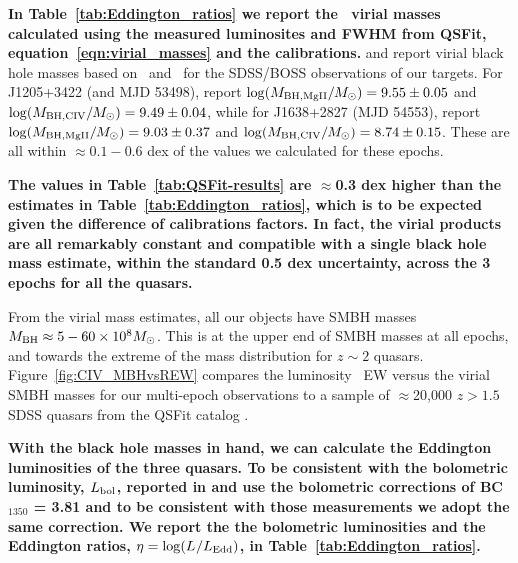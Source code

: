 \documentclass[fleqn,usenatbib]{mnras}
\begin{document}
{\bf In Table~\ref{tab:Eddington_ratios} we report the \civ\ virial
masses calculated using the measured luminosites and FWHM from QSFit,
equation~\ref{eqn:virial_masses} and the
\citet{VestergaardPeterson2006} calibrations.} \citet{Shen2011} and
\citet{Kozlowski2017} report virial black hole masses based on \mgii\
and \civ\ for the SDSS/BOSS observations of our targets. For
J1205+3422 (and MJD 53498), \citet{Shen2011} report $\log (M_{\rm BH,
MgII}/M_{\odot}) = 9.55 \pm 0.05$ and $\log(M_{\rm BH, CIV}/M_{\odot})
= 9.49 \pm 0.04$, while for J1638+2827 (MJD 54553), \citet{Shen2011}
report $\log (M_{\rm BH, MgII}/M_{\odot}) = 9.03 \pm 0.37$ and
$\log(M_{\rm BH, CIV}/M_{\odot}) = 8.74 \pm 0.15$.  These are all
within $\approx 0.1 - 0.6$ dex of the values we calculated for these
epochs.

{\bf The values in Table~\ref{tab:QSFit-results} are $\approx$0.3 dex
higher than the estimates in Table~\ref{tab:Eddington_ratios}, which
is to be expected given the difference of calibrations factors. In
fact, the virial products are all remarkably constant and compatible
with a single black hole mass estimate, within the standard 0.5 dex
uncertainty, across the 3 epochs for all the quasars.}

From the virial mass estimates, all our objects have SMBH masses
$M_{\rm BH} \approx 5 - 60 \times10^{8} M_{\odot}$.  This is at the upper
end of SMBH masses at all epochs, and towards the extreme of the mass
distribution for $z\sim2$ quasars.  Figure~\ref{fig:CIV_MBHvsREW}
compares the luminosity \civ\ EW versus the virial SMBH masses for our
multi-epoch observations to a sample of $\approx$20,000 $z>1.5$ SDSS
quasars from the QSFit catalog \citep{Calderone2017}.

{\bf With the black hole masses in hand, we can calculate the
Eddington luminosities of the three quasars. To be consistent with the
bolometric luminosity, $L_{\rm bol}$, reported in \citet{Shen2011} and
\citet{Kozlowski2017} use the bolometric corrections of BC$_{1350}$ =
3.81 \citep[from the composite spectral energy distribution
in][]{Richards2006b} and to be consistent with those measurements we
adopt the same correction.  We report the the bolometric luminosities
and the Eddington ratios, $\eta=\log(L_{}/L_{\rm Edd})$, in
Table~\ref{tab:Eddington_ratios}.}
\end{document}
